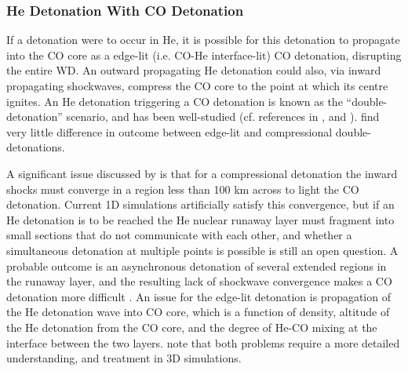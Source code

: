 


\subsubsection{He Detonation With CO Detonation}

If a detonation were to occur in He, it is possible for this detonation to propagate into the CO core as a edge-lit (i.e. CO-He interface-lit) CO detonation, disrupting the entire WD.  An outward propagating He detonation could also, via inward propagating shockwaves, compress the CO core to the point at which its centre ignites.  An He detonation triggering a CO detonation is known as the ``double-detonation'' scenario, and has been well-studied (cf. references in \cite{woosk10}, \cite{finkhr07} and \cite{fink+10}).  \citeauthor{woosk10} find very little difference in outcome between edge-lit and compressional double-detonations.

A significant issue discussed by \citeauthor{woosk10} is that for a compressional detonation the inward shocks must converge in a region less than 100 km across to light the CO detonation.  Current 1D simulations artificially satisfy this convergence, but if an He detonation is to be reached the He nuclear runaway layer must fragment into small sections that do not communicate with each other, and whether a simultaneous detonation at multiple points is possible is still an open question.  A probable outcome is an asynchronous detonation of several extended regions in the runaway layer, and the resulting lack of shockwave convergence makes a CO detonation more difficult \citep{woosk10}.  An issue for the edge-lit detonation is propagation of the He detonation wave into CO core, which is a function of density, altitude of the He detonation from the CO core, and the degree of He-CO mixing at the interface between the two layers.  \citeauthor{woosk10} note that both problems require a more detailed understanding, and treatment in 3D simulations.

